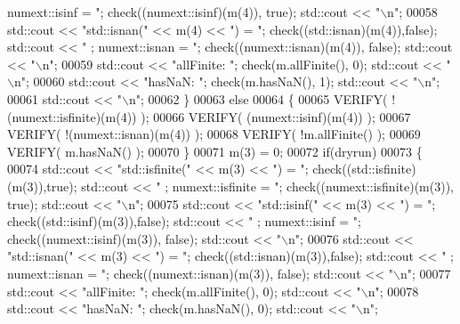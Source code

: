 \begin{DoxyCode}
{       numext::isinf    = "}; check((numext::isinf)(m(4)), \textcolor{keyword}{true}); std::cout << \textcolor{stringliteral}{"\(\backslash\)n"};
00058     std::cout << \textcolor{stringliteral}{"std::isnan("} << m(4) << \textcolor{stringliteral}{")    = "}; check((std::isnan)(m(4)),\textcolor{keyword}{false});    std::cout << \textcolor{stringliteral}{"  ;
       numext::isnan    = "}; check((numext::isnan)(m(4)), \textcolor{keyword}{false}); std::cout << \textcolor{stringliteral}{"\(\backslash\)n"};
00059     std::cout << \textcolor{stringliteral}{"allFinite: "}; check(m.allFinite(), 0); std::cout << \textcolor{stringliteral}{"\(\backslash\)n"};
00060     std::cout << \textcolor{stringliteral}{"hasNaN:    "}; check(m.hasNaN(), 1);    std::cout << \textcolor{stringliteral}{"\(\backslash\)n"};
00061     std::cout << \textcolor{stringliteral}{"\(\backslash\)n"};
00062   \}
00063   \textcolor{keywordflow}{else}
00064   \{
00065     VERIFY( !(numext::isfinite)(m(4)) );
00066     VERIFY(  (numext::isinf)(m(4)) );
00067     VERIFY( !(numext::isnan)(m(4)) );
00068     VERIFY( !m.allFinite() );
00069     VERIFY(  m.hasNaN() );
00070   \}
00071   m(3) = 0;
00072   \textcolor{keywordflow}{if}(dryrun)
00073   \{
00074     std::cout << \textcolor{stringliteral}{"std::isfinite("} << m(3) << \textcolor{stringliteral}{") = "}; check((std::isfinite)(m(3)),\textcolor{keyword}{true}); std::cout << \textcolor{stringliteral}{"  ;
       numext::isfinite = "}; check((numext::isfinite)(m(3)), \textcolor{keyword}{true}); std::cout << \textcolor{stringliteral}{"\(\backslash\)n"};
00075     std::cout << \textcolor{stringliteral}{"std::isinf("} << m(3) << \textcolor{stringliteral}{")    = "}; check((std::isinf)(m(3)),\textcolor{keyword}{false});    std::cout << \textcolor{stringliteral}{"  ;
       numext::isinf    = "}; check((numext::isinf)(m(3)), \textcolor{keyword}{false}); std::cout << \textcolor{stringliteral}{"\(\backslash\)n"};
00076     std::cout << \textcolor{stringliteral}{"std::isnan("} << m(3) << \textcolor{stringliteral}{")    = "}; check((std::isnan)(m(3)),\textcolor{keyword}{false});     std::cout << \textcolor{stringliteral}{"  ;
       numext::isnan    = "}; check((numext::isnan)(m(3)), \textcolor{keyword}{false}); std::cout << \textcolor{stringliteral}{"\(\backslash\)n"};
00077     std::cout << \textcolor{stringliteral}{"allFinite: "}; check(m.allFinite(), 0); std::cout << \textcolor{stringliteral}{"\(\backslash\)n"};
00078     std::cout << \textcolor{stringliteral}{"hasNaN:    "}; check(m.hasNaN(), 0);    std::cout << \textcolor{stringliteral}{"\(\backslash\)n"};

\end{DoxyCode}
